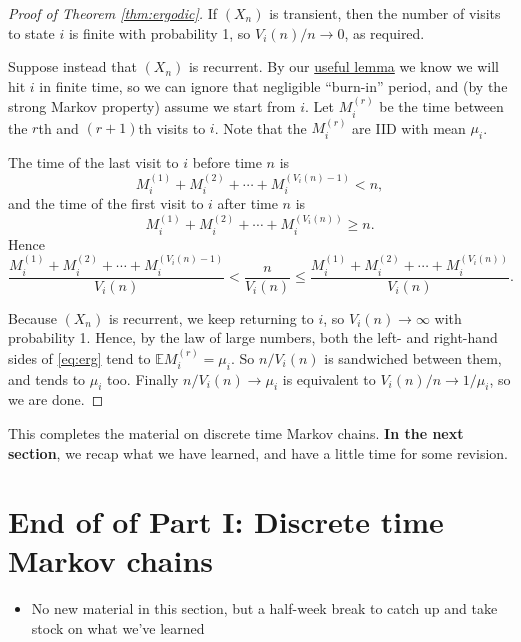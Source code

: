 \documentclass[
  a4paper,
]{article}
\providecommand{\tightlist}{%
  \setlength{\itemsep}{0pt}\setlength{\parskip}{0pt}}
\theoremstyle{definition}
\theoremstyle{definition}
\theoremstyle{definition}
\theoremstyle{remark}
\begin{document}
\begin{proof}[Proof of Theorem \ref{thm:ergodic}]

If \((X_n)\) is transient, then the number of visits to state \(i\) is finite with probability 1, so \(V_i(n)/n \to 0\), as required.

Suppose instead that \((X_n)\) is recurrent. By our \protect\hyperlink{S09-lemma}{useful lemma} we know we will hit \(i\) in finite time, so we can ignore that negligible ``burn-in'' period, and (by the strong Markov property) assume we start from \(i\). Let \(M_{i}^{(r)}\) be the time between the \(r\)th and \((r+1)\)th visits to \(i\). Note that the \(M_{i}^{(r)}\) are IID with mean \(\mu_i\).

The time of the last visit to \(i\) before time \(n\) is
\[ M_{i}^{(1)} + M_{i}^{(2)} + \cdots + M_{i}^{(V_i(n)-1)} < n ,\]
and the time of the first visit to \(i\) after time \(n\) is
\[ M_{i}^{(1)} + M_{i}^{(2)} + \cdots + M_{i}^{(V_i(n))} \geq n .\]
Hence
\begin{equation}
\frac{M_{i}^{(1)} + M_{i}^{(2)} + \cdots + M_{i}^{(V_i(n)-1)}}{V_i(n)} < \frac{n}{V_i(n)} \leq \frac{M_{i}^{(1)} + M_{i}^{(2)} + \cdots + M_{i}^{(V_i(n))}}{V_i(n)} . \label{eq:erg}
\end{equation}

Because \((X_n)\) is recurrent, we keep returning to \(i\), so \(V_i(n) \to \infty\) with probability 1. Hence, by the law of large numbers, both the left- and right-hand sides of \eqref{eq:erg} tend to \(\mathbb E M_{i}^{(r)} = \mu_i\). So \(n/V_i(n)\) is sandwiched between them, and tends to \(\mu_i\) too. Finally \(n/V_i(n) \to \mu_i\) is equivalent to \(V_i(n)/n \to 1/\mu_i\), so we are done.

\end{proof}

This completes the material on discrete time Markov chains. \textbf{In the next section}, we recap what we have learned, and have a little time for some revision.

\hypertarget{S12-revision-i}{%
\section{End of of Part I: Discrete time Markov chains}\label{S12-revision-i}}

\begin{itemize}
\tightlist
\item
  No new material in this section, but a half-week break to catch up and take stock on what we've learned
\end{itemize}
\end{document}
